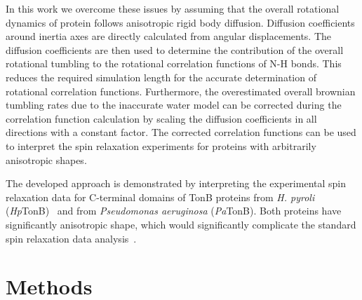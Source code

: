 \documentclass[pre,aps,floatfix,authordate1-4,twocolumn]{revtex4-1}
\begin{document}
In this work we overcome these issues by assuming that the overall
rotational dynamics of protein follows anisotropic rigid body diffusion.
Diffusion coefficients around inertia axes are 
directly calculated from angular displacements.
The diffusion coefficients are then used to determine the
contribution of the overall rotational tumbling to the 
rotational correlation functions of N-H bonds.
This reduces the required simulation length for the accurate determination
of rotational correlation functions. Furthermore, the overestimated
overall brownian tumbling rates due to the inaccurate water model
can be corrected during the correlation function calculation by scaling
the diffusion coefficients in all directions with a constant factor.
The corrected correlation functions can be used to interpret the spin relaxation
experiments for proteins with arbitrarily anisotropic shapes.

The developed approach is demonstrated by interpreting the experimental spin relaxation data 
for C-terminal domains of TonB proteins from {\it H. pyroli} ({\it Hp}TonB)~\cite{ciragan16}
and from {\it Pseudomonas aeruginosa} ({\it Pa}TonB). Both proteins have significantly
anisotropic shape, which would significantly complicate the standard spin relaxation data
analysis~\cite{woessner62,shimizu62,jarymowycz06,korzhnev01,luginbuhl97,hall04}.


\section{Methods}
\end{document}
